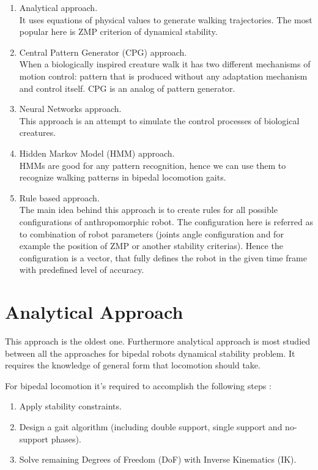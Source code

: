 \documentclass[12pt,a4paper]{report}
\begin{document}
		\begin{enumerate}
			\item Analytical approach.\\ It uses equations of physical values to generate walking trajectories. The most popular here is ZMP criterion of dynamical stability.
			\item Central Pattern Generator (CPG) approach.\\ When a biologically inspired creature walk it has two different mechanisms of motion control: pattern that is produced without any adaptation mechanism and control  itself. CPG is an analog of pattern generator.
			\item Neural Networks approach.\\ This approach is an attempt to simulate the control processes of biological creatures.
			\item Hidden Markov Model (HMM) approach.\\ HMMs are good for any pattern recognition, hence we can use them to recognize walking patterns in bipedal locomotion gaits.
			\item Rule based approach.\\ The main idea behind this approach is to create rules for all possible configurations of anthropomorphic robot. The configuration here is referred as to combination of robot parameters (joints angle configuration and for example the position of ZMP or another stability criterias). Hence the configuration is a vector, that fully defines the robot in the given time frame with predefined level of accuracy.
		\end{enumerate}

		\section{Analytical Approach}
			This approach is the oldest one. Furthermore analytical approach is most studied between all the approaches for bipedal robots dynamical stability problem. It requires the knowledge of general form that locomotion should take.

		For bipedal locomotion it's required to accomplish the following steps \cite{wright2014intelligent}:
		\begin{enumerate}
			\item Apply stability constraints.
			\item Design a gait algorithm (including double support, single support and no-support phases).
			\item Solve remaining Degrees of Freedom (DoF) with Inverse Kinematics (IK).
		\end{enumerate}
		
\end{document}
